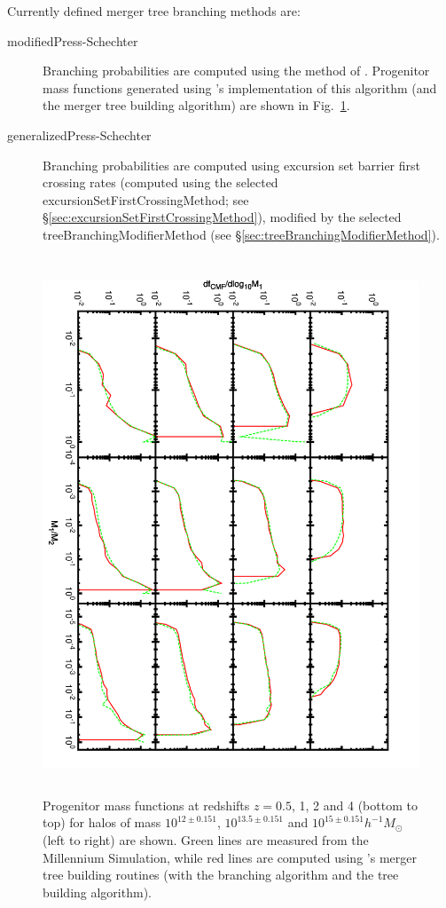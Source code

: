 Currently defined merger tree branching methods are:
\begin{description}
 \item [{\normalfont \ttfamily modifiedPress-Schechter}] Branching probabilities are computed using the method of \cite{parkinson_generating_2008}. Progenitor mass functions generated using \glc's implementation of this algorithm (and the \cite{cole_hierarchical_2000} merger tree building algorithm) are shown in Fig.~\ref{fig:PCH_Progenitor_MFs}.
 \item [{\normalfont \ttfamily generalizedPress-Schechter}] Branching probabilities are computed using excursion set barrier first crossing rates (computed using the selected {\normalfont \ttfamily excursionSetFirstCrossingMethod}; see \S\ref{sec:excursionSetFirstCrossingMethod}), modified by the selected {\normalfont \ttfamily treeBranchingModifierMethod} (see \S\ref{sec:treeBranchingModifierMethod}).
\end{description}

\begin{figure}
 \begin{center}
 \includegraphics[height=160mm,angle=90]{../plots/progenitorMassFunction.pdf}
 \end{center}
 \caption{Progenitor mass functions at redshifts $z=0.5$, 1, 2 and 4 (bottom to top) for halos of mass $10^{12\pm0.151}$, $10^{13.5\pm0.151}$ and $10^{15\pm0.151}h^{-1}M_\odot$ (left to right) are shown. Green lines are measured from the Millennium Simulation, while red lines are computed using \glc's merger tree building routines (with the \cite{parkinson_generating_2008} branching algorithm and the \cite{cole_hierarchical_2000} tree building algorithm).}
 \label{fig:PCH_Progenitor_MFs}
\end{figure}


